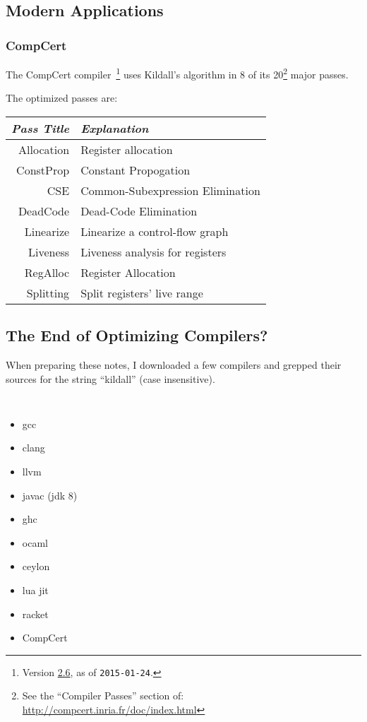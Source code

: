 \documentclass{article}
\begin{document}
\subsection*{Modern Applications}

\subsubsection*{CompCert}
The CompCert compiler~\cite{src,refman}\footnote{Version \href{https://github.com/AbsInt/CompCert/releases}{2.6}, as of \texttt{2015-01-24}.} uses Kildall's algorithm in 8 of its 20\footnote{See the ``Compiler Passes'' section of: \url{http://compcert.inria.fr/doc/index.html}} major passes.

The optimized passes are:

\begin{tabular}{r l}
\emph{Pass Title} & \emph{Explanation} \\\hline
 Allocation & Register allocation \\
 ConstProp  & Constant Propogation \\
 CSE        & Common-Subexpression Elimination \\
 DeadCode   & Dead-Code Elimination \\
 Linearize  & Linearize a control-flow graph \\
 Liveness   & Liveness analysis for registers \\
 RegAlloc   & Register Allocation \\
 Splitting  & Split registers' live range \\
\end{tabular}


\subsection*{The End of Optimizing Compilers?}
When preparing these notes, I downloaded a few compilers and grepped their sources for the string ``kildall'' (case insensitive).

\begin{multicols}{2}
{\tt
 \begin{itemize}
 \item[] gcc
 \item[] clang
 \item[] llvm
 \item[] javac (jdk 8)
 \item[] ghc
 \item[] ocaml
 \item[] ceylon
 \item[] lua jit
 \item[] racket
 \item[] CompCert
 \end{itemize}
}
\end{multicols}
\end{document}
